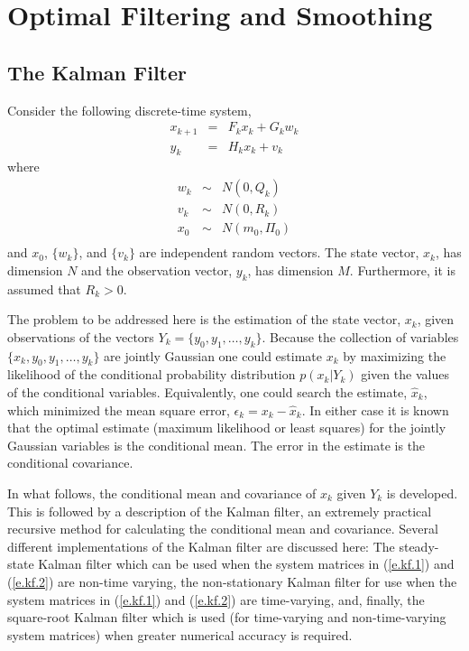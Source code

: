\chapter{Optimal Filtering and Smoothing}

\section{The Kalman Filter}

	Consider the following discrete-time system,
%
\begin{eqnarray}
x_{k+1}&=&F_kx_k+G_kw_k\nonumber\\
y_k&=&H_kx_k+v_k
\label{e.kf.1}
\end{eqnarray}
%
where
%
\begin{eqnarray}
w_k&\sim&N(0,Q_k)\nonumber\\
v_k&\sim&N(0,R_k)\nonumber\\
x_0&\sim&N(m_0,\Pi_0)\nonumber\\
\label{e.kf.1a}
\end{eqnarray}
%
and $x_0$, $\{w_k\}$, and $\{v_k\}$ are independent random vectors.
The state vector, $x_k$, has dimension $N$ and the observation
vector, $y_k$, has dimension $M$.  Furthermore, it is assumed that
$R_k>0$.

	The problem to be addressed here is the estimation
of the state vector, $x_k$, given observations of the vectors
$Y_k=\{y_0,y_1,\ldots,y_k\}$.  Because the collection of variables
$\{x_k,y_0,y_1,\ldots,y_k\}$ are jointly Gaussian 
one could estimate $x_k$ by maximizing the likelihood
of the conditional probability distribution $p(x_k|Y_k)$
given the values of the conditional variables.  Equivalently,
one could search the estimate, $\hat{x}_k$, which minimized the
mean square error, $\epsilon_k=x_k-\hat{x}_k$.  In either case it
is known that the optimal estimate (maximum likelihood or least
squares) for the jointly Gaussian variables is the conditional mean.
The error in the estimate is the conditional covariance.

	In what follows, the conditional mean and covariance
of $x_k$ given $Y_k$ is developed.  This is followed by
a description of the Kalman filter, an extremely practical
recursive method for calculating the conditional mean and covariance.
Several different implementations of the Kalman filter are discussed
here:  The steady-state Kalman filter which can be used when
the system matrices in (\ref{e.kf.1}) and (\ref{e.kf.2}) are non-time varying, 
the non-stationary Kalman filter for use when the system matrices in
(\ref{e.kf.1}) and (\ref{e.kf.2}) 
are time-varying, and, finally, the square-root
Kalman filter which is used (for time-varying and non-time-varying
system matrices) when greater numerical accuracy is required.

